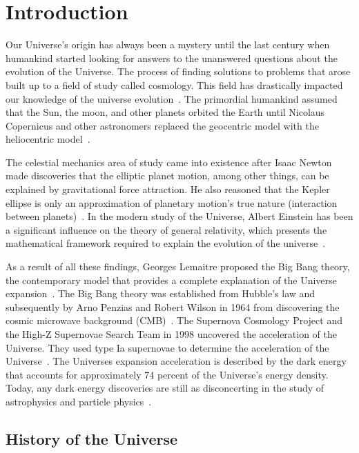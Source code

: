 \chapter{Introduction}

	Our Universe's origin has always been a mystery until the last century when humankind started looking for answers to the unanswered questions about the evolution of the Universe. The process of finding solutions to problems that arose built up to a field of study called cosmology. This field has drastically impacted our knowledge of the universe evolution~\citep{book:909085}. The primordial humankind assumed that the Sun, the moon, and other planets orbited the Earth until Nicolaus Copernicus and other astronomers replaced the geocentric model with the heliocentric model~\citep{sep-copernicus, kanas}.
	
	The celestial mechanics area of study came into existence after Isaac Newton made discoveries that the elliptic planet motion, among other things, can be explained by gravitational force attraction. He also reasoned that the Kepler ellipse is only an approximation of planetary motion's true nature (interaction between planets)~\citep{crowe2013theories,sep-copernicus}. In the modern study of the Universe, Albert Einstein has been a significant influence on the theory of general relativity, which presents the mathematical framework required to explain the evolution of the universe~\citep{1965ApJ...142..419P}.
	
	As a result of all these findings, Georges Lemaitre proposed the Big Bang theory, the contemporary model that provides a complete explanation of the Universe expansion~\citep{1926ApJ....64..321H}. The Big Bang theory was established from Hubble's law and subsequently by Arno Penzias and Robert Wilson in 1964 from discovering the cosmic microwave background (CMB)~\citep{1965ApJ...142..419P,2003RvMP...75..559P,1929PNAS...15..168H}. The Supernova Cosmology Project and the High-Z Supernovae Search Team in 1998 uncovered the acceleration of the Universe. They used type Ia supernovae to determine the acceleration of the Universe~\citep{1998AJ....116.1009R, 1999ApJ...517..565P}. The Universes expansion acceleration is described by the dark energy that accounts for approximately 74 percent of the Universe's energy density. Today, any dark energy discoveries are still as disconcerting in the study of astrophysics and particle physics~\citep{2008ARA&A..46..385F}.\\
	
	\section{History of the Universe}
	

